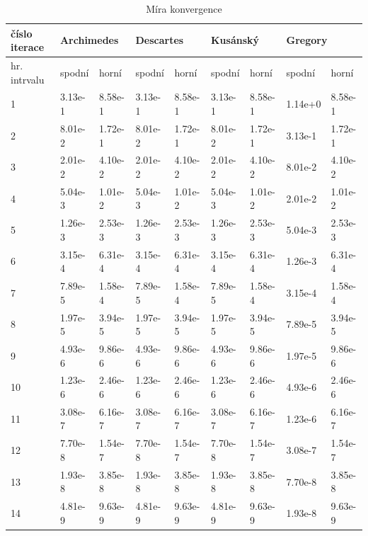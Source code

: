 \documentclass[rocnikovka]{gzwroc} %
\begin{document}
\begin{table}[h!]
\caption{Míra konvergence}
\begin{tabular}{|l|l|l|l|l|l|l|l|l|}
\hline
\multicolumn{1}{|l|}{\bfseries číslo iterace} & \multicolumn{2}{l|}{\bfseries Archimedes} & \multicolumn{2}{l|}{\bfseries Descartes} & \multicolumn{2}{l|}{\bfseries Kusánský} & \multicolumn{2}{l|}{\bfseries Gregory}  \\ \hline
\multicolumn{1}{|l|}{hr. intrvalu} & \multicolumn{1}{l|}{spodní} & \multicolumn{1}{l|}{horní} & \multicolumn{1}{l|}{spodní} & \multicolumn{1}{l|}{horní} & \multicolumn{1}{l|}{spodní} & \multicolumn{1}{l|}{horní} & \multicolumn{1}{l|}{spodní} & \multicolumn{1}{l|}{horní} \\ \hline \hline
1 & 3.13e-1 & 8.58e-1 & 3.13e-1 & 8.58e-1 & 3.13e-1 & 8.58e-1 & 1.14e+0 & 8.58e-1 \\ \hline 
2 & 8.01e-2 & 1.72e-1 & 8.01e-2 & 1.72e-1 & 8.01e-2 & 1.72e-1 & 3.13e-1 & 1.72e-1 \\ \hline 
3 & 2.01e-2 & 4.10e-2 & 2.01e-2 & 4.10e-2 & 2.01e-2 & 4.10e-2 & 8.01e-2 & 4.10e-2 \\ \hline 
4 & 5.04e-3 & 1.01e-2 & 5.04e-3 & 1.01e-2 & 5.04e-3 & 1.01e-2 & 2.01e-2 & 1.01e-2 \\ \hline 
5 & 1.26e-3 & 2.53e-3 & 1.26e-3 & 2.53e-3 & 1.26e-3 & 2.53e-3 & 5.04e-3 & 2.53e-3 \\ \hline 
6 & 3.15e-4 & 6.31e-4 & 3.15e-4 & 6.31e-4 & 3.15e-4 & 6.31e-4 & 1.26e-3 & 6.31e-4 \\ \hline 
7 & 7.89e-5 & 1.58e-4 & 7.89e-5 & 1.58e-4 & 7.89e-5 & 1.58e-4 & 3.15e-4 & 1.58e-4 \\ \hline 
8 & 1.97e-5 & 3.94e-5 & 1.97e-5 & 3.94e-5 & 1.97e-5 & 3.94e-5 & 7.89e-5 & 3.94e-5 \\ \hline 
9 & 4.93e-6 & 9.86e-6 & 4.93e-6 & 9.86e-6 & 4.93e-6 & 9.86e-6 & 1.97e-5 & 9.86e-6 \\ \hline 
10 & 1.23e-6 & 2.46e-6 & 1.23e-6 & 2.46e-6 & 1.23e-6 & 2.46e-6 & 4.93e-6 & 2.46e-6 \\ \hline 
11 & 3.08e-7 & 6.16e-7 & 3.08e-7 & 6.16e-7 & 3.08e-7 & 6.16e-7 & 1.23e-6 & 6.16e-7 \\ \hline 
12 & 7.70e-8 & 1.54e-7 & 7.70e-8 & 1.54e-7 & 7.70e-8 & 1.54e-7 & 3.08e-7 & 1.54e-7 \\ \hline 
13 & 1.93e-8 & 3.85e-8 & 1.93e-8 & 3.85e-8 & 1.93e-8 & 3.85e-8 & 7.70e-8 & 3.85e-8 \\ \hline 
14 & 4.81e-9 & 9.63e-9 & 4.81e-9 & 9.63e-9 & 4.81e-9 & 9.63e-9 & 1.93e-8 & 9.63e-9 \\ \hline 

\end{tabular}
\end{table}
\end{document}
